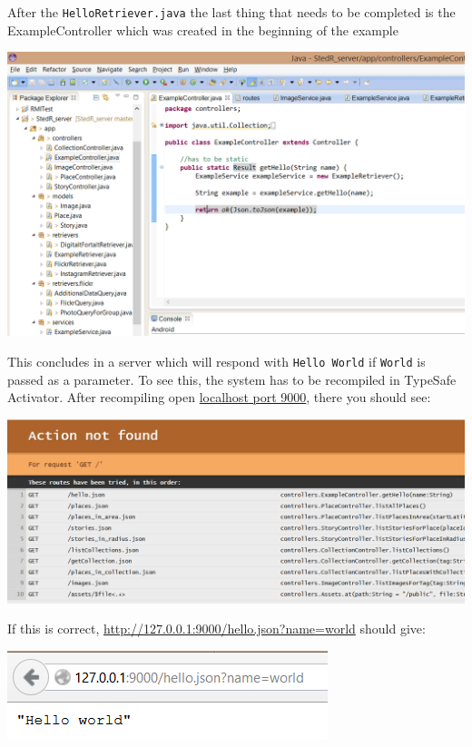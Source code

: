 After the \texttt{HelloRetriever.java} the last thing that needs to be completed is the ExampleController which was created in the beginning of the example

\begin{center}
\includegraphics[scale=0.6]{guide/eclipse6.png} 
\end{center}

This concludes in a server which will respond with \texttt{Hello World} if  \texttt{World} is passed as a parameter. To see this, the system has to be recompiled in TypeSafe Activator. After recompiling open \href{http://127.0.0.1:9000}{localhost port 9000}, there you should see:

\begin{center}
\includegraphics[scale=0.6]{guide/localhost.png} 
\end{center}

If this is correct,  \href{http://127.0.0.1:9000/hello.json?name=world}{http://127.0.0.1:9000/hello.json?name=world} should give:

\begin{center}
\includegraphics[scale=0.8]{guide/completed.png} 
\end{center}

